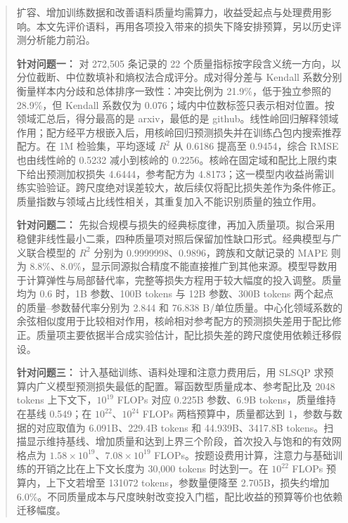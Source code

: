 
\begingroup
\renewcommand*{\mriteabstracttitlefont}{\heiti}
\renewcommand*{\mritekeywordslabelfont}{\song\bfseries}
\begin{abstract}

扩容、增加训练数据和改善语料质量均需算力，收益受起点与处理费用影响。本文先评价语料，再用各项投入带来的损失下降安排预算，另以历史评测分析能力前沿。

\textbf{针对问题一：} 对 272,505 条记录的 22 个质量指标按字段含义统一方向，以分位截断、中位数填补和熵权法合成评分。成对得分差与 Kendall 系数分别衡量样本内分歧和总体排序一致性：冲突比例为 21.9\%，低于独立参照的 28.9\%，但 Kendall 系数仅为 0.076；域内中位数标签只表示相对位置。按领域汇总后，得分最高的是 arxiv，最低的是 github。线性岭回归解释领域作用；配方经平方根嵌入后，用核岭回归预测损失并在训练凸包内搜索推荐配方。在 1M 检验集，平均逐域 $R^2$ 从 0.6186 提高至 0.9454，综合 RMSE 也由线性岭的 0.5232 减小到核岭的 0.2256。核岭在固定域和配比上限约束下给出预测加权损失 4.6444，参考配方为 4.8173；这一模型内收益尚需训练实验验证。跨尺度绝对误差较大，故后续仅将配比损失差作为条件修正。质量指数与领域占比线性相关，其重复加入不能识别质量的独立作用。

\textbf{针对问题二：} 先拟合规模与损失的经典标度律，再加入质量项。拟合采用稳健非线性最小二乘，四种质量项对照后保留加性缺口形式。经典模型与广义联合模型的 $R^2$ 分别为 0.9999998、0.9896，跨族和文献记录的 MAPE 则为 8.8\%、8.0\%，显示同源拟合精度不能直接推广到其他来源。模型导数用于计算弹性与局部替代率，完整等损失方程用于较大幅度的投入调整。质量均为 0.6 时，1B 参数、100B tokens 与 12B 参数、300B tokens 两个起点的质量--参数替代率分别为 2.844 和 76.838 B/单位质量。中心化领域系数的余弦相似度用于比较相对作用，核岭相对参考配方的预测损失差用于配比修正。质量项主要依据半合成实验估计，配比损失差的跨尺度使用依赖迁移假设。

\textbf{针对问题三：} 计入基础训练、语料处理和注意力费用后，用 SLSQP 求预算内广义模型预测损失最低的配置。幂函数型质量成本、参考配比及 2048 tokens 上下文下，$10^{19}$ FLOPs 对应 0.225B 参数、6.9B tokens，质量维持在基线 0.549；在 $10^{22}$、$10^{24}$ FLOPs 两档预算中，质量都达到 1，参数与数据的对应取值为 6.091B、229.4B tokens 和 44.939B、3417.8B tokens。扫描显示维持基线、增加质量和达到上界三个阶段，首次投入与饱和的有效网格点为 $1.58\times10^{19}$、$7.08\times10^{19}$ FLOPs。按题设费用计算，注意力与基础训练的开销之比在上下文长度为 30,000 tokens 时达到一。在 $10^{22}$ FLOPs 预算内，上下文若增至 131072 tokens，参数量便降至 2.705B，损失约增加 6.0\%。不同质量成本与尺度映射改变投入门槛，配比收益的预算等价也依赖迁移幅度。


\end{abstract}
